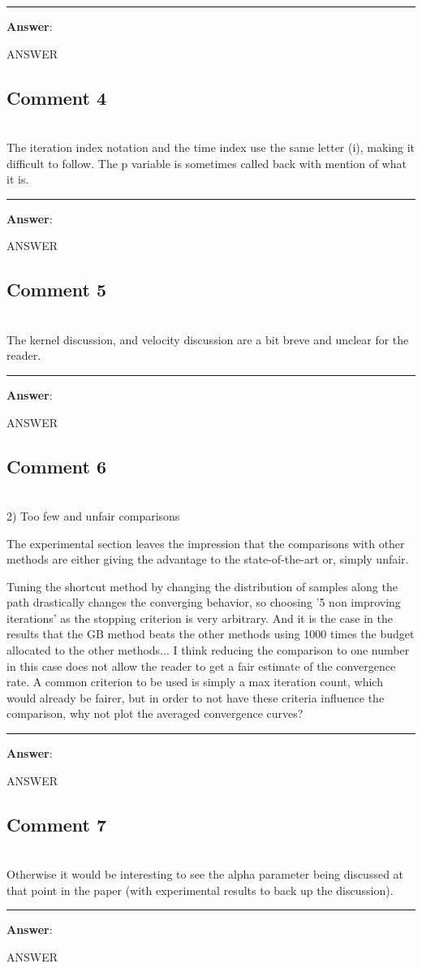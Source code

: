 \documentclass{scrartcl}
\begin{document}
\rule{\linewidth}{.1pt}
\textbf{Answer}:

ANSWER

\subsection{Comment 4}
\hrulefill\\

The iteration index notation and the time index use the same letter (i), making it difficult to follow. The p variable is sometimes called back with mention of what it is.

\rule{\linewidth}{.1pt}
\textbf{Answer}:

ANSWER

\subsection{Comment 5}
\hrulefill\\

The kernel discussion, and velocity discussion are a bit breve and unclear for the reader.

\rule{\linewidth}{.1pt}
\textbf{Answer}:

ANSWER

\subsection{Comment 6}
\hrulefill\\

2) Too few and unfair comparisons

The experimental section leaves the impression that the comparisons with other methods are either giving the advantage to the state-of-the-art or, simply unfair. 

Tuning the shortcut method by changing the distribution of samples along the path drastically changes the converging behavior, so choosing '5 non improving iterations' as the stopping criterion is very arbitrary. And it is the case in the results that the GB method beats the other methods using 1000 times the budget allocated to the other methods... I think reducing the comparison to one number in this case does not allow the reader to get a fair estimate of the convergence rate. A common criterion to be used is simply a max iteration count, which would already be fairer, but in order to not have these criteria influence the comparison, why not plot the averaged convergence curves?

\rule{\linewidth}{.1pt}
\textbf{Answer}:

ANSWER

\subsection{Comment 7}
\hrulefill\\

Otherwise it would be interesting to see the alpha parameter being discussed at that point in the paper (with experimental results to back up the discussion).

\rule{\linewidth}{.1pt}
\textbf{Answer}:

ANSWER
\end{document}
